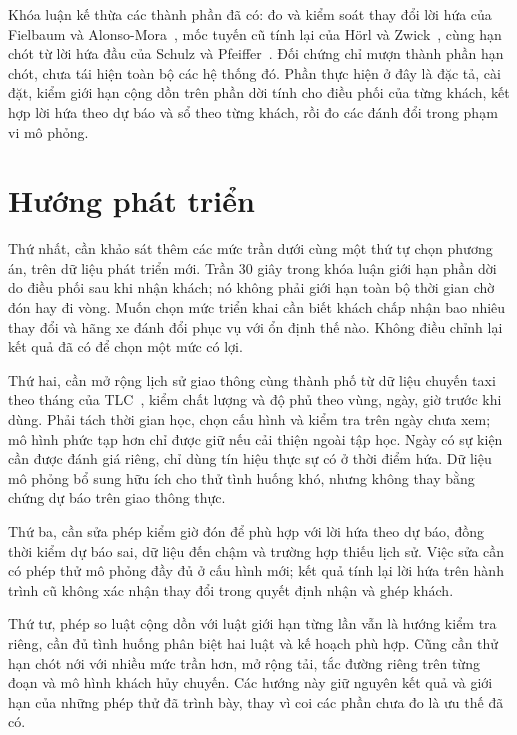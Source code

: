 Khóa luận kế thừa các thành phần đã có: đo và kiểm soát thay đổi lời hứa của Fielbaum và
Alonso-Mora~\cite{fielbaum2020}, mốc tuyến cũ tính lại của Hörl và Zwick~\cite{horl2022}, cùng hạn chót từ lời
hứa đầu của Schulz và Pfeiffer~\cite{schulz2026}. Đối chứng chỉ mượn thành phần hạn chót, chưa tái hiện toàn
bộ các hệ thống đó. Phần thực hiện ở đây là đặc tả, cài đặt, kiểm giới hạn cộng dồn trên phần dời tính cho
điều phối của từng khách, kết hợp lời hứa theo dự báo và sổ theo từng khách, rồi đo các đánh đổi trong phạm vi mô phỏng.

\section{Hướng phát triển}
\label{muc:c5-huongphattrien}

Thứ nhất, cần khảo sát thêm các mức trần dưới cùng một thứ tự chọn phương án, trên dữ liệu phát triển mới.
Trần 30 giây trong khóa luận giới hạn phần dời do điều phối sau khi nhận khách; nó không phải giới hạn toàn bộ
thời gian chờ đón hay đi vòng. Muốn chọn mức triển khai cần biết khách chấp nhận bao nhiêu thay đổi và hãng xe
đánh đổi phục vụ với ổn định thế nào. Không điều chỉnh lại kết quả đã có để chọn một mức có lợi.

Thứ hai, cần mở rộng lịch sử giao thông cùng thành phố từ dữ liệu chuyến taxi theo tháng của
TLC~\cite{tlc}, kiểm chất lượng và độ phủ theo vùng, ngày, giờ trước khi dùng. Phải tách thời gian học, chọn
cấu hình và kiểm tra trên ngày chưa xem; mô hình phức tạp hơn chỉ được giữ nếu cải thiện ngoài tập học.
Ngày có sự kiện cần được đánh giá riêng, chỉ dùng tín hiệu thực sự có ở thời điểm hứa. Dữ liệu mô phỏng
bổ sung hữu ích cho thử tình huống khó, nhưng không thay bằng chứng dự báo trên giao thông thực.

Thứ ba, cần sửa phép kiểm giờ đón để phù hợp với lời hứa theo dự báo, đồng thời kiểm dự báo sai, dữ liệu
đến chậm và trường hợp thiếu lịch sử. Việc sửa cần có phép thử mô phỏng đầy đủ ở cấu hình mới; kết quả
tính lại lời hứa trên hành trình cũ không xác nhận thay đổi trong quyết định nhận và ghép khách.

Thứ tư, phép so luật cộng dồn với luật giới hạn từng lần vẫn là hướng kiểm tra riêng, cần đủ tình huống
phân biệt hai luật và kế hoạch phù hợp. Cũng cần thử hạn chót nới với nhiều mức trần hơn, mở rộng tải,
tắc đường riêng trên từng đoạn và mô hình khách hủy chuyến. Các hướng này giữ nguyên kết quả và giới hạn
của những phép thử đã trình bày, thay vì coi các phần chưa đo là ưu thế đã có.
